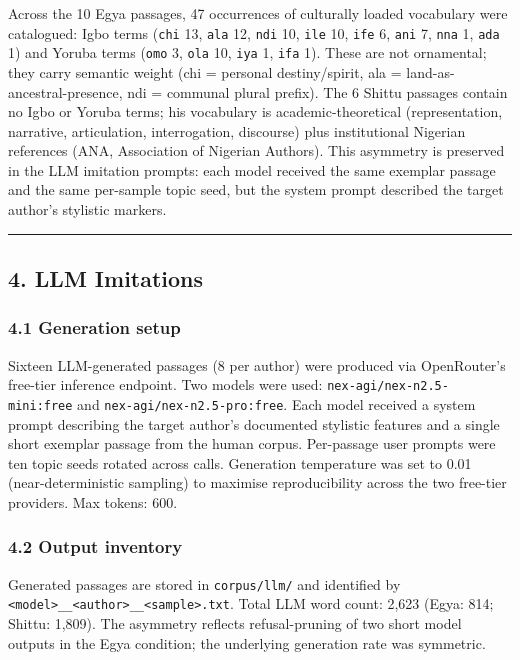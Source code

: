 Across the 10 Egya passages, 47 occurrences of culturally loaded
vocabulary were catalogued: Igbo terms (\texttt{chi} 13, \texttt{ala}
12, \texttt{ndi} 10, \texttt{ile} 10, \texttt{ife} 6, \texttt{ani} 7,
\texttt{nna} 1, \texttt{ada} 1) and Yoruba terms (\texttt{omo} 3,
\texttt{ola} 10, \texttt{iya} 1, \texttt{ifa} 1). These are not
ornamental; they carry semantic weight (chi = personal destiny/spirit,
ala = land-as-ancestral-presence, ndi = communal plural prefix). The 6
Shittu passages contain no Igbo or Yoruba terms; his vocabulary is
academic-theoretical (representation, narrative, articulation,
interrogation, discourse) plus institutional Nigerian references (ANA,
Association of Nigerian Authors). This asymmetry is preserved in the LLM
imitation prompts: each model received the same exemplar passage and the
same per-sample topic seed, but the system prompt described the target
author's stylistic markers.

\begin{center}\rule{0.5\linewidth}{0.5pt}\end{center}

\subsection{4. LLM Imitations}\label{llm-imitations}

\subsubsection{4.1 Generation setup}\label{generation-setup}

Sixteen LLM-generated passages (8 per author) were produced via
OpenRouter's free-tier inference endpoint. Two models were used:
\texttt{nex-agi/nex-n2.5-mini:free} and
\texttt{nex-agi/nex-n2.5-pro:free}. Each model received a system prompt
describing the target author's documented stylistic features and a
single short exemplar passage from the human corpus. Per-passage user
prompts were ten topic seeds rotated across calls. Generation
temperature was set to 0.01 (near-deterministic sampling) to maximise
reproducibility across the two free-tier providers. Max tokens: 600.

\subsubsection{4.2 Output inventory}\label{output-inventory}

Generated passages are stored in \texttt{corpus/llm/} and identified by
\texttt{\textless{}model\textgreater{}\_\_\textless{}author\textgreater{}\_\_\textless{}sample\textgreater{}.txt}.
Total LLM word count: 2,623 (Egya: 814; Shittu: 1,809). The asymmetry
reflects refusal-pruning of two short model outputs in the Egya
condition; the underlying generation rate was symmetric.

